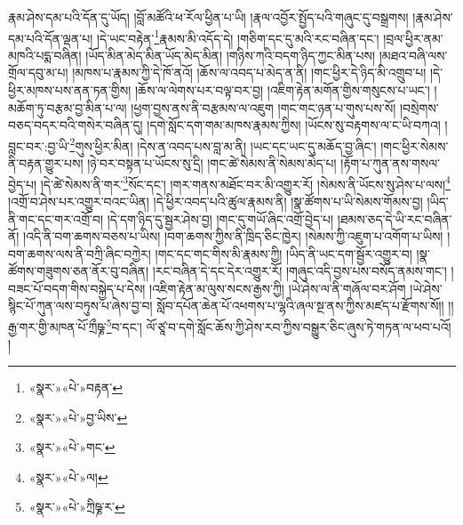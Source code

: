 རྣམ་ཤེས་དམ་པའི་དོན་དུ་ཡོད། །བློ་མཚོའི་ཕ་རོལ་ཕྱིན་པ་ཡི། །རྣལ་འབྱོར་སྤྱོད་པའི་གཞུང་དུ་བསྒྲགས། །རྣམ་ཤེས་དམ་པའི་དོན་ལྡན་པ། །དེ་ཡང་བརྟེན་\footnote{«སྣར་»«པེ་»བརྟན་}རྣམས་མི་འདོད་དེ། །གཅིག་དང་དུ་མའི་རང་བཞིན་དང་། །བྲལ་ཕྱིར་ནམ་མཁའི་པདྨ་བཞིན། །ཡོད་མིན་མེད་མིན་ཡོད་མེད་མིན། །གཉིས་ཀའི་བདག་ཉིད་ཀྱང་མིན་པས། །མཐའ་བཞི་ལས་གྲོལ་དབུ་མ་པ། །མཁས་པ་རྣམས་ཀྱི་དེ་ཁོ་ནའོ། །ཆོས་ལ་འབད་པ་མེད་ན་ནི། །གང་ཕྱིར་དེ་ཉིད་མི་འགྲུབ་པ། །དེ་ཕྱིར་མཁས་པས་ནན་ཏན་གྱིས། །ཆོས་ལ་ལེགས་པར་བལྟ་བར་བྱ། །འཇིག་རྟེན་མགོན་གྱིས་གསུངས་པ་ཡང་། །མཆོག་ཏུ་བརྩམ་བྱ་མིན་པ་ལ། །ཕྱག་བྱས་ནས་ནི་བརྩམས་ལ་འཇུག །གང་གང་ཉན་པ་གུས་པས་སོ། །བསྲེགས་བཅད་བདར་བའི་གསེར་བཞིན་དུ། །དགེ་སློང་དག་གམ་མཁས་རྣམས་ཀྱིས། །ཡོངས་སུ་བརྟགས་ལ་ང་ཡི་བཀའ། །བླང་བར་:བྱ་ཡི་\footnote{«སྣར་»«པེ་»བྱ་ཡིས་}གུས་ཕྱིར་མིན། །དེས་ན་འབད་པས་བླ་མ་ནི། །ཡང་དང་ཡང་དུ་མཆོད་བྱ་ཞིང་། །གང་ཕྱིར་སེམས་ནི་བརྟན་གྱུར་པས། །ཉེ་བར་བསྟན་པ་ཡོངས་སུ་དྲི། །གང་ཚེ་སེམས་ནི་སེམས་མེད་པ། །རྟོག་པ་ཀུན་ནས་གསལ་བྱེད་པ། །དེ་ཚེ་སེམས་ནི་གར་\footnote{«སྣར་»«པེ་»གང་}སོང་དང་། །གར་གནས་མཐོང་བར་མི་འགྱུར་རོ། །སེམས་ནི་ཡོངས་སུ་ཤེས་པ་ལས།\footnote{«སྣར་»«པེ་»ལ།} །འགྲོ་བ་ཤེས་པར་འགྱུར་བའང་ཡིན། །དེ་ཕྱིར་འབད་པའི་ཚུལ་རྣམས་ནི། །སྣ་ཚོགས་པ་ཡི་སེམས་གོམས་བྱ། །ཡིད་ནི་གང་དང་གར་འགྲོ་བ། །དེ་དག་ཉིད་དུ་སྦྱར་ཤེས་བྱ། །གང་དུ་གཡོ་ཞིང་འགྲོ་བྱེད་པ། །ཐམས་ཅད་དེ་ཡི་རང་བཞིན་ནོ། །འདི་ནི་བག་ཆགས་བཅས་པ་ཡིས། །བག་ཆགས་ཀྱིས་ནི་ཁྲིད་ཅིང་ཁྱེར། །སེམས་ཀྱི་འཇུག་པ་འགོག་པ་ཡིས། །བག་ཆགས་ལས་ནི་བཀྲི་ཞིང་བཀྱེར། །གང་དང་གང་གིས་མི་རྣམས་ཀྱི། །ཡིད་ནི་ཡང་དག་སྦྱོར་འགྱུར་བ། །སྣ་ཚོགས་གཟུགས་ཅན་ནོར་བུ་བཞིན། །རང་བཞིན་དེ་དང་དེར་འགྱུར་རོ། །གཞུང་འདི་བྱས་པས་བསོད་ནམས་གང་། །བཟང་པོ་བདག་གིས་བསྐྱེད་པ་དེས། །འཇིག་རྟེན་མ་ལུས་སངས་རྒྱས་ཀྱི། །ཡེ་ཤེས་ལ་ནི་གཞོལ་བར་ཤོག །ཡེ་ཤེས་སྙིང་པོ་ཀུན་ལས་བཏུས་པ་ཞེས་བྱ་བ། སློབ་དཔོན་ཆེན་པོ་འཕགས་པ་ལྷའི་ཞལ་སྔ་ནས་ཀྱིས་མཛད་པ་རྫོགས་སོ།། །།རྒྱ་གར་གྱི་མཁན་པོ་ཀྲྀཥྞ་\footnote{«སྣར་»«པེ་»ཀྲིཥྞ་ར་}བ་དང་། ལོ་ཙཱ་བ་དགེ་སློང་ཆོས་ཀྱི་ཤེས་རབ་ཀྱིས་བསྒྱུར་ཅིང་ཞུས་ཏེ་གཏན་ལ་ཕབ་པའོ། །
 